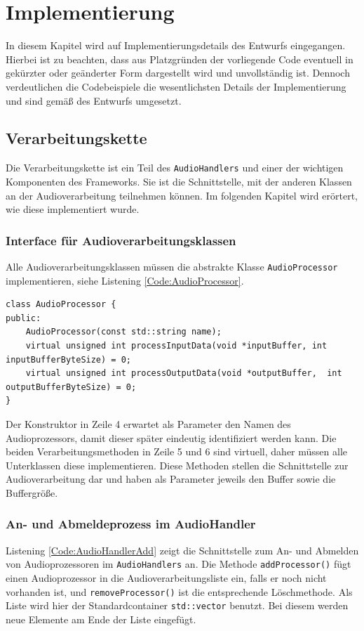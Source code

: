 \chapter{Implementierung}
In diesem Kapitel wird auf Implementierungsdetails des Entwurfs eingegangen. Hierbei ist zu beachten, dass aus Platzgründen der vorliegende Code eventuell in gekürzter oder geänderter Form dargestellt wird und unvollständig ist. Dennoch verdeutlichen die Codebeispiele die wesentlichsten Details der Implementierung und sind gemäß des Entwurfs umgesetzt.

\section{Verarbeitungskette}
Die Verarbeitungskette ist ein Teil des \texttt{AudioHandlers} und einer der wichtigen Komponenten des Frameworks. Sie ist die Schnittstelle, mit der anderen Klassen an der Audioverarbeitung teilnehmen können. Im folgenden Kapitel wird erörtert, wie diese implementiert wurde.

\subsection{Interface für Audioverarbeitungsklassen}
Alle Audioverarbeitungsklassen müssen die abstrakte Klasse \texttt{AudioProcessor} implementieren, siehe Listening \ref{Code:AudioProcessor}.

\begin{lstlisting}[caption={Interface des AudioProcessors},label={Code:AudioProcessor}]
class AudioProcessor {
public:
	AudioProcessor(const std::string name);
	virtual unsigned int processInputData(void *inputBuffer, int inputBufferByteSize) = 0;
	virtual unsigned int processOutputData(void *outputBuffer,  int outputBufferByteSize) = 0;
}
\end{lstlisting}
Der Konstruktor in Zeile 4 erwartet als Parameter den Namen des Audioprozessors, damit dieser später eindeutig identifiziert werden kann. Die beiden Verarbeitungsmethoden in Zeile 5 und 6 sind virtuell, daher müssen alle Unterklassen diese implementieren. Diese Methoden stellen die Schnittstelle zur Audioverarbeitung dar und haben als Parameter jeweils den Buffer sowie die Buffergröße.

\subsection{An- und Abmeldeprozess im AudioHandler}
Listening \ref{Code:AudioHandlerAdd} zeigt die Schnittstelle zum An- und Abmelden von Audioprozessoren im \texttt{AudioHandlers} an. Die Methode \texttt{addProcessor()} fügt einen Audioprozessor in die Audioverarbeitungsliste ein, falls er noch nicht vorhanden ist, und \texttt{removeProcessor()} ist die entsprechende Löschmethode. Als Liste wird hier der Standardcontainer \texttt{std::vector} benutzt. Bei diesem werden neue Elemente am Ende der Liste eingefügt.

